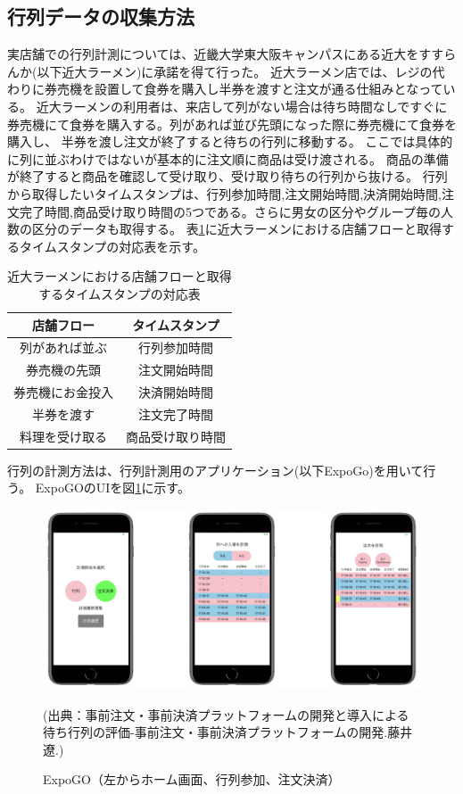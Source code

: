 \documentclass{jsarticle}
\begin{document}
\subsection{行列データの収集方法}
実店舗での行列計測については、近畿大学東大阪キャンパスにある近大をすすらんか(以下近大ラーメン)に承諾を得て行った。
近大ラーメン店では、レジの代わりに券売機を設置して食券を購入し半券を渡すと注文が通る仕組みとなっている。
近大ラーメンの利用者は、来店して列がない場合は待ち時間なしですぐに券売機にて食券を購入する。列があれば並び先頭になった際に券売機にて食券を購入し、
半券を渡し注文が終了すると待ちの行列に移動する。
ここでは具体的に列に並ぶわけではないが基本的に注文順に商品は受け渡される。
商品の準備が終了すると商品を確認して受け取り、受け取り待ちの行列から抜ける。
行列から取得したいタイムスタンプは、行列参加時間,注文開始時間,決済開始時間,注文完了時間,商品受け取り時間の5つである。さらに男女の区分やグループ毎の人数の区分のデータも取得する。
表\ref{table2}に近大ラーメンにおける店舗フローと取得するタイムスタンプの対応表を示す。

\begin{table}[H]
 \begin{center}
   \caption{近大ラーメンにおける店舗フローと取得するタイムスタンプの対応表}
   \begin{tabular}{|c|c|} \hline
店舗フロー      & タイムスタンプ \\ \hline \hline
列があれば並ぶ   & 行列参加時間 \\ \hline
券売機の先頭     & 注文開始時間 \\ \hline
券売機にお金投入  & 決済開始時間 \\ \hline
半券を渡す       & 注文完了時間 \\ \hline
料理を受け取る   & 商品受け取り時間 \\ \hline
  \end{tabular}
 \label{table2}
 \end{center}
\end{table}

行列の計測方法は、行列計測用のアプリケーション(以下ExpoGo)\cite{bibi4}を用いて行う。
ExpoGOのUIを図\ref{fig:4}に示す。


\begin{figure}[H]
  \centering
  \includegraphics[width=14.5cm]{4.png}
  \caption{ExpoGO（左からホーム画面、行列参加、注文決済）}
\scriptsize(出典：事前注文・事前決済プラットフォームの開発と導入による待ち行列の評価-事前注文・事前決済プラットフォームの開発.藤井遼.)
  \label{fig:4}
\end{figure}
\end{document}
